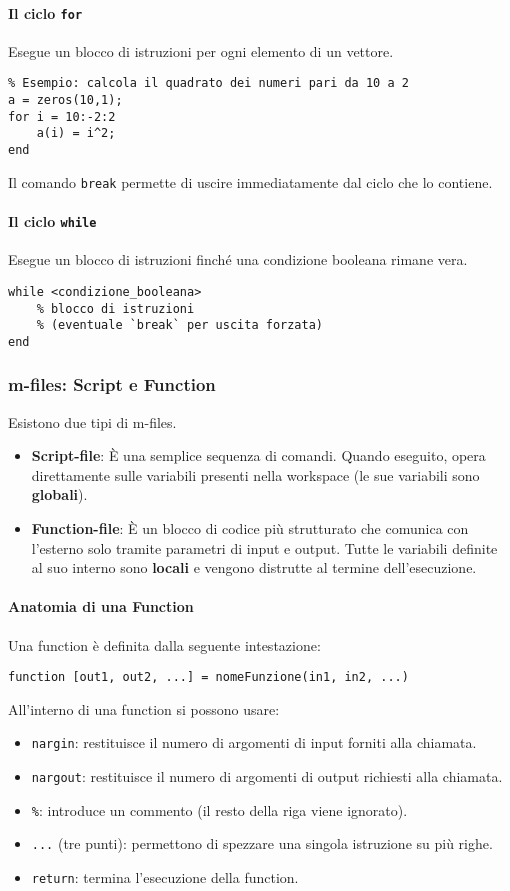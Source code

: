 \paragraph{Il ciclo \texttt{for}} Esegue un blocco di istruzioni per ogni elemento di un vettore.
\begin{lstlisting}
% Esempio: calcola il quadrato dei numeri pari da 10 a 2
a = zeros(10,1);
for i = 10:-2:2
    a(i) = i^2;
end
\end{lstlisting}
Il comando \texttt{break} permette di uscire immediatamente dal ciclo che lo contiene.

\paragraph{Il ciclo \texttt{while}} Esegue un blocco di istruzioni finché una condizione booleana rimane vera.
\begin{lstlisting}[frame=none, numbers=none]
while <condizione_booleana>
    % blocco di istruzioni
    % (eventuale `break` per uscita forzata)
end
\end{lstlisting}

\subsubsection{m-files: Script e Function}
Esistono due tipi di m-files.
\begin{itemize}
    \item \textbf{Script-file}: È una semplice sequenza di comandi. Quando eseguito, opera direttamente sulle variabili presenti nella workspace (le sue variabili sono \textbf{globali}).
    \item \textbf{Function-file}: È un blocco di codice più strutturato che comunica con l'esterno solo tramite parametri di input e output. Tutte le variabili definite al suo interno sono \textbf{locali} e vengono distrutte al termine dell'esecuzione.
\end{itemize}

\paragraph{Anatomia di una Function}
Una function è definita dalla seguente intestazione:
\begin{lstlisting}[frame=none, numbers=none]
function [out1, out2, ...] = nomeFunzione(in1, in2, ...)
\end{lstlisting}
All'interno di una function si possono usare:
\begin{itemize}
    \item \texttt{nargin}: restituisce il numero di argomenti di input forniti alla chiamata.
    \item \texttt{nargout}: restituisce il numero di argomenti di output richiesti alla chiamata.
    \item \texttt{\%}: introduce un commento (il resto della riga viene ignorato).
    \item \texttt{...} (tre punti): permettono di spezzare una singola istruzione su più righe.
    \item \texttt{return}: termina l'esecuzione della function.
\end{itemize}

